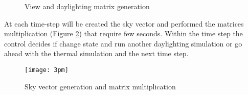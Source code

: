 \begin{figure}[h] 
\centering
  \caption{\label{img5:matrices} View and daylighting matrix generation}
\end{figure}

At each time-step will be created the sky vector and performed the matrices multiplication (Figure \ref{img5:3pm}) that require few seconds. Within the time step the control decides if change state and run another daylighting simulation or go ahead with the thermal simulation and the next time step.

\begin{figure}[h]
\centering
\texttt{[image: 3pm]}
\caption{\label{img5:3pm} Sky vector generation and matrix multiplication }
\end{figure}



